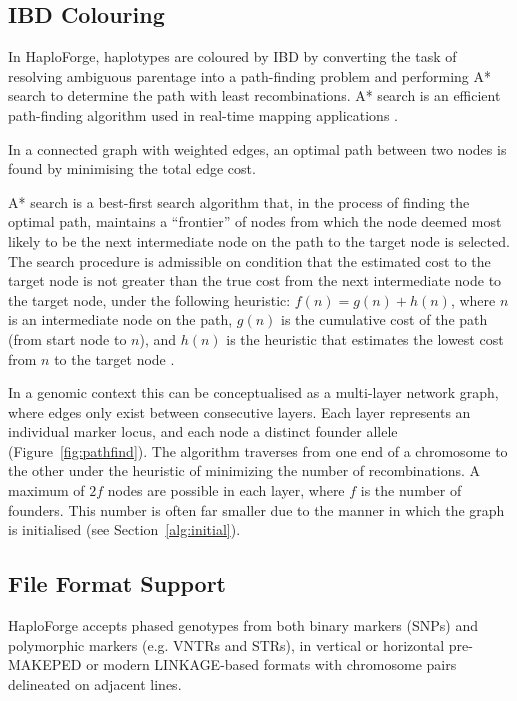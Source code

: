 \documentclass{bioinfo}
\numberwithin{equation}{section}
\def\haplo{{HaploForge}}
\begin{document}
\subsection{IBD Colouring}

In \haplo{}, haplotypes are coloured by IBD by converting the task of resolving ambiguous parentage into a path-finding problem and performing A* search to determine the path with least recombinations. A* search is an efficient path-finding algorithm used in real-time mapping applications \citep{algfoor2015comprehensive}.

In a connected graph with weighted edges, an optimal path between two nodes is found by minimising the total edge cost. 

A* search is a best-first search algorithm that, in the process of finding the optimal path, maintains a ``frontier'' of nodes from which the node deemed most likely to be the next intermediate node on the path to the target node is selected. The search procedure is admissible on condition that the estimated cost to the target node is not greater than the true cost from the next intermediate node to the target node, under the following heuristic: $f(n) = g(n) + h(n)$, where $n$ is an intermediate node on the path, $g(n)$ is the cumulative cost of the path (from start node to $n$), and $h(n)$ is the heuristic that estimates the lowest cost from $n$ to the target node \citep{astar}.

In a genomic context this can be conceptualised as a multi-layer network graph, where edges only exist between consecutive layers. Each layer represents an individual marker locus, and each node a distinct founder allele (Figure~\ref{fig:pathfind}). The algorithm traverses from one end of a chromosome to the other under the heuristic of minimizing the number of recombinations. A maximum of $2f$ nodes are possible in each layer, where $f$ is the number of founders. This number is often far smaller due to the manner in which the graph is initialised (see Section~\ref{alg:initial}).

\subsection{File Format Support}\label{sec:fileformat}

\haplo{} accepts phased genotypes from both binary markers (SNPs) and polymorphic markers (e.g. VNTRs and STRs), in vertical or horizontal pre-MAKEPED or modern LINKAGE-based formats with chromosome pairs delineated on adjacent lines. 
\end{document}
